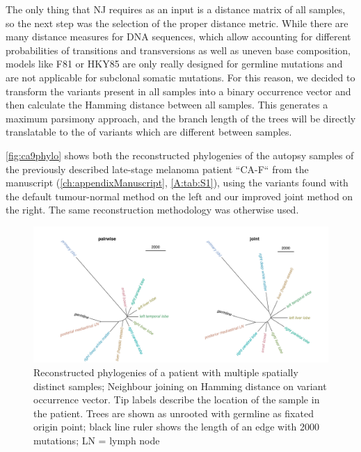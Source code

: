 The only thing that NJ requires as an input is a distance matrix of all samples, so the next step was the selection of the proper distance metric. While there are many distance measures for DNA sequences, which allow accounting for different probabilities of transitions and transversions as well as uneven base composition, models like F81 \cite{Felsenstein1981} or HKY85 \cite{Hasegawa1985} are only really designed for germline mutations and are not  applicable for subclonal somatic mutations. For this reason, we decided  to  transform the variants present in all samples into a binary occurrence vector and then calculate the Hamming distance \cite{Hamming1950} between all samples. This  generates a maximum parsimony approach, and the branch length of the trees will be directly translatable to the  of variants which are different between samples. 

\autoref{fig:ca9phylo} shows both the reconstructed phylogenies of the autopsy samples of the previously described late-stage melanoma patient ``CA-F`` from the manuscript (\autoref{ch:appendixManuscript}, \autoref{A:tab:S1}), using the variants found with the default tumour-normal method on the left and our improved joint method on the right. The  same reconstruction methodology was otherwise used.

\begin{figure}[ht]
\centering
\includegraphics[width=.99\linewidth]{Figures/jointVariantCalling/phyloCA9.pdf}
\caption[Reconstructed phylogenies of joint samples]{Reconstructed phylogenies of a patient with multiple spatially distinct samples; Neighbour joining on Hamming distance on variant occurrence vector. Tip labels describe the location of the sample in the patient. Trees are shown as unrooted with germline as fixated origin point; black line ruler shows the length of an edge with 2000 mutations; LN = lymph node}\label{fig:ca9phylo}
\end{figure}


